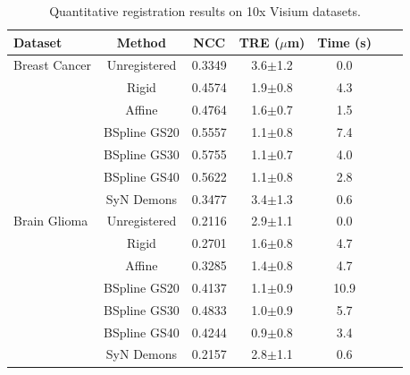 \begin{table}[htbp]
\centering
\caption{Quantitative registration results on 10x Visium datasets.}
\label{tab:final_results}
\begin{tabular}{@{}lcccccc@{}}
\toprule
\textbf{Dataset} & \textbf{Method} & \textbf{NCC} & \textbf{TRE ($\mu$m)} & \textbf{Time (s)} \\
\midrule
  Breast Cancer & Unregistered & 0.3349 & 3.6$\pm$1.2 & 0.0 \\
   & Rigid & 0.4574 & 1.9$\pm$0.8 & 4.3 \\
   & Affine & 0.4764 & 1.6$\pm$0.7 & 1.5 \\
   & BSpline GS20 & 0.5557 & 1.1$\pm$0.8 & 7.4 \\
   & BSpline GS30 & 0.5755 & 1.1$\pm$0.7 & 4.0 \\
   & BSpline GS40 & 0.5622 & 1.1$\pm$0.8 & 2.8 \\
   & SyN Demons & 0.3477 & 3.4$\pm$1.3 & 0.6 \\
  Brain Glioma & Unregistered & 0.2116 & 2.9$\pm$1.1 & 0.0 \\
   & Rigid & 0.2701 & 1.6$\pm$0.8 & 4.7 \\
   & Affine & 0.3285 & 1.4$\pm$0.8 & 4.7 \\
   & BSpline GS20 & 0.4137 & 1.1$\pm$0.9 & 10.9 \\
   & BSpline GS30 & 0.4833 & 1.0$\pm$0.9 & 5.7 \\
   & BSpline GS40 & 0.4244 & 0.9$\pm$0.8 & 3.4 \\
   & SyN Demons & 0.2157 & 2.8$\pm$1.1 & 0.6 \\
\bottomrule
\end{tabular}
\end{table}